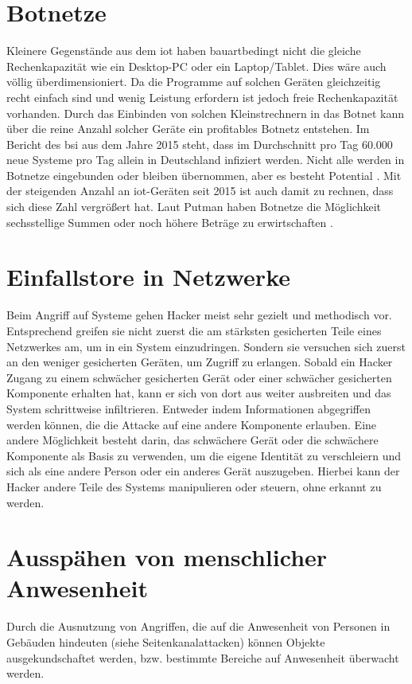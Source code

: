 \documentclass[12pt, a4paper, onecolumn, oneside, toc=bibliographynumbered, liststotoc]{scrreprt} %
\begin{document}
		\section{Botnetze}
  Kleinere Gegenstände aus dem \ac{iot} haben bauartbedingt nicht die gleiche Rechenkapazität wie ein Desktop-PC oder ein Laptop/Tablet. Dies wäre auch völlig überdimensioniert. Da die Programme auf solchen Geräten gleichzeitig recht einfach sind und wenig Leistung erfordern ist jedoch freie Rechenkapazität vorhanden. Durch das Einbinden von solchen Kleinstrechnern in das Botnet kann über die reine Anzahl solcher Geräte ein profitables Botnetz entstehen. Im Bericht des \ac{bsi} aus dem Jahre 2015 steht, dass im Durchschnitt pro Tag 60.000 neue Systeme pro Tag allein in Deutschland infiziert werden. Nicht alle werden in Botnetze eingebunden oder bleiben übernommen, aber es besteht Potential \parencite[30]{BundesamtfurSicherheitinderInformationstechnik.20210106}. Mit der steigenden Anzahl an \ac{iot}-Geräten seit 2015 ist auch damit zu rechnen, dass sich diese Zahl vergrößert hat. Laut Putman haben Botnetze die Möglichkeit sechsstellige Summen oder noch höhere Beträge zu erwirtschaften \parencite{Putman.2018}. 
  
		\section{Einfallstore in Netzwerke}
  Beim Angriff auf Systeme gehen Hacker meist sehr gezielt und methodisch vor. Entsprechend greifen sie nicht zuerst die am stärksten gesicherten Teile eines Netzwerkes am, um in ein System einzudringen. Sondern sie versuchen sich zuerst an den weniger gesicherten Geräten, um Zugriff zu erlangen. Sobald ein Hacker Zugang zu einem schwächer gesicherten Gerät oder einer schwächer gesicherten Komponente erhalten hat, kann er sich von dort aus weiter ausbreiten und das System schrittweise infiltrieren. Entweder indem Informationen abgegriffen werden können, die die Attacke auf eine andere Komponente erlauben. Eine andere Möglichkeit besteht darin, das schwächere Gerät oder die schwächere Komponente als Basis zu verwenden, um die eigene Identität zu verschleiern und sich als eine andere Person oder ein anderes Gerät auszugeben. Hierbei kann der Hacker andere Teile des Systems manipulieren oder steuern, ohne erkannt zu werden.
  
		\section{Ausspähen von menschlicher Anwesenheit}
  Durch die Ausnutzung von Angriffen, die auf die Anwesenheit von Personen in Gebäuden hindeuten (siehe Seitenkanalattacken) können Objekte ausgekundschaftet werden, bzw. bestimmte Bereiche auf Anwesenheit überwacht werden.
\end{document}
